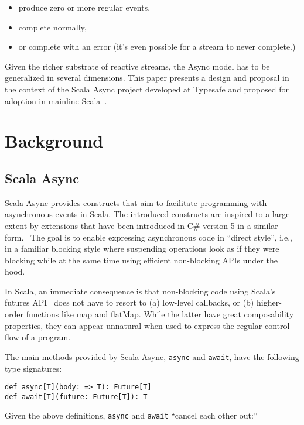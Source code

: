 \documentclass{acm_proc_article-sp}
\begin{document}
\begin{itemize}
\item produce zero or more regular events,
\item complete normally,
\item or complete with an error (it's even possible for a stream to never complete.)
\end{itemize}

Given the richer substrate of reactive streams, the Async model has to be
generalized in several dimensions. This paper presents a design and proposal
in the context of the Scala Async project developed at Typesafe and proposed
for adoption in mainline Scala~\cite{ScalaAsyncSIP}.

\section{Background}

\subsection{Scala Async}\label{sec:scala-async}

Scala Async provides constructs that aim to facilitate programming with
asynchronous events in Scala. The introduced constructs are inspired to a
large extent by extensions that have been introduced in C\# version 5 in a
similar form.~\cite{FormalizingAsync} The goal is to enable expressing
asynchronous code in ``direct style'', i.e., in a familiar blocking style
where suspending operations look as if they were blocking while at the same
time using efficient non-blocking APIs under the hood.

In Scala, an immediate consequence is that non-blocking code using Scala's
futures API~\cite{ScalaFuturesSIP} does not have to resort to (a) low-level
callbacks, or (b) higher-order functions like map and flatMap. While the
latter have great composability properties, they can appear unnatural when
used to express the regular control flow of a program.

The main methods provided by Scala Async, \verb|async| and \verb|await|, have
the following type signatures:

\begin{lstlisting}
def async[T](body: => T): Future[T]
def await[T](future: Future[T]): T
\end{lstlisting}

Given the above definitions, \verb|async| and \verb|await| ``cancel each other
out:''
\end{document}
